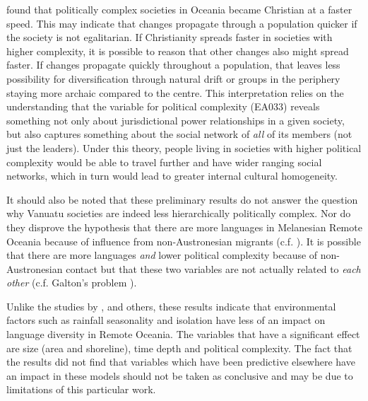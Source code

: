 \documentclass[a4paper,10pt]{article} %
\begin{document}
\citet{watts_2018} found that politically complex societies in Oceania became Christian at a faster speed. This may indicate that changes propagate through a population quicker if the society is not egalitarian. If Christianity spreads faster in societies with higher complexity, it is possible to reason that other changes also might spread faster. If changes propagate quickly throughout a population, that leaves less possibility for diversification through natural drift or groups in the periphery staying more archaic compared to the centre. This interpretation relies on the understanding that the variable for political complexity (EA033) reveals something not only about jurisdictional power relationships in a given society, but also captures something about the social network of \emph{all} of its members (not just the leaders). Under this theory, people living in societies with higher political complexity would be able to travel further and have wider ranging social networks, which in turn would lead to greater internal cultural homogeneity.

It should also be noted that these preliminary results do not answer the question why Vanuatu societies are indeed less hierarchically politically complex. Nor do they disprove the hypothesis that there are more languages in Melanesian Remote Oceania because of influence from non-Austronesian migrants (c.f. \citet{lynch1981melanesian}). It is possible that there are more languages \emph{and} lower political complexity because of non-Austronesian contact but that these two variables are not actually related to \emph{each other} (c.f. Galton's problem \citep{naroll1965galton}). 


Unlike the studies by \citet{gavin2012island}, \citet{hua2019ecological} and others, these results indicate that environmental factors such as rainfall seasonality and isolation have less of an impact on language diversity in Remote Oceania. The variables that have a significant effect are size (area and shoreline), time depth and political complexity. The fact that the results did not find that variables which have been predictive elsewhere have an impact in these models should not be taken as conclusive and may be due to limitations of this particular work.
\end{document}
